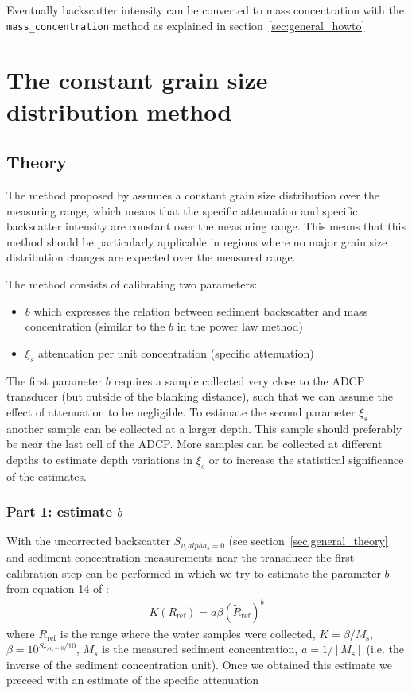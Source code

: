 \documentclass[]{article}
\begin{document}
Eventually backscatter intensity can be converted to mass concentration with the \lstinline!mass_concentration! method as explained in section~\ref{sec:general_howto}

\section{The constant grain size distribution method}

\subsection{Theory}
The method proposed by \citet{sassi2012} assumes a constant grain size distribution over the measuring range, which means that the specific attenuation and specific backscatter intensity are constant over the measuring range. This means that this method should be particularly applicable in regions where no major grain size distribution changes are expected over the measured range.

The method consists of calibrating two parameters:
\begin{itemize}
  \item $b$ which expresses the relation between sediment backscatter and mass concentration (similar to the $b$ in the power law method)
  \item $\xi_s$ attenuation per unit concentration (specific attenuation)
\end{itemize}
The first parameter $b$ requires a sample collected very close to the ADCP transducer (but outside of the blanking distance), such that we can assume the effect of attenuation to be negligible.
To estimate the second parameter $\xi_s$ another sample can be collected at a larger depth. This sample should preferably be near the last cell of the ADCP. More samples can be collected at different depths to estimate depth variations in $\xi_s$ or to increase the statistical significance of the estimates.


\subsubsection{Part 1: estimate $b$}
With the uncorrected backscatter $S_{v,alpha_s=0}$ (see section~\ref{sec:general_theory} and sediment concentration measurements near the transducer the first calibration step can be performed in which we try to estimate the parameter $b$ from equation 14 of \citet{sassi2012}:
\begin{align}
  K(R_\text{ref})=a\beta(\tilde{R}_\text{ref})^b
\end{align}
where $R_\text{ref}$ is the range where the water samples were collected, $K=\beta/M_\text{s}$, $\beta=10^{S_{\text{v,}\alpha_\text{s}=0}/10}$, $M_s$ is the measured sediment concentration, $a=1/[M_\text{s}]$ (i.e. the inverse of the sediment concentration unit). 
Once we obtained this estimate we preceed with an estimate of the specific attenuation
\end{document}
